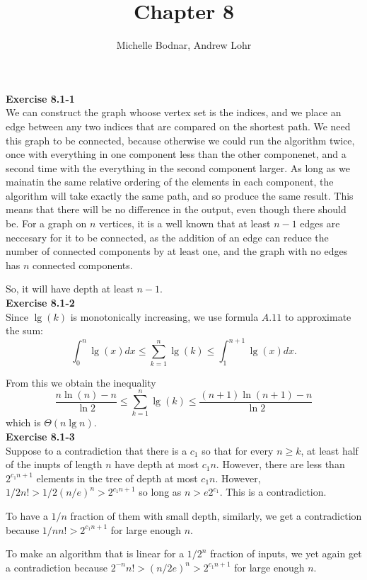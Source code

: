 \documentclass{article}
\title{Chapter 8}
\author{Michelle Bodnar, Andrew Lohr}
\begin{document}
\maketitle

\noindent\textbf{Exercise 8.1-1}\\

We can construct the graph whoose vertex set is the indices, and we place an edge between any two indices that are compared on the shortest path. We need this graph to be connected, because otherwise we could run the algorithm twice, once with everything in one component less than the other componenet, and a second time with the everything in the second component larger. As long as we mainatin the same relative ordering of the elements in each component, the algorithm will take exactly the same path, and so produce the same result. This means that there will be no difference in the output, even though there should be. For a graph on $n$ vertices, it is a well known that at least $n-1$ edges are neccesary for it to be connected, as the addition of an edge can reduce the number of connected components by at least one, and the graph with no edges has $n$ connected components.

So, it will have depth at least $n-1$.\\

\noindent\textbf{Exercise 8.1-2}\\

Since $\lg(k)$ is monotonically increasing, we use formula $A.11$ to approximate the sum:
\[ \int_0^n \lg(x)dx \leq \sum_{k=1}^n \lg(k) \leq \int_1^{n+1}\lg(x)dx.\]

From this we obtain the inequality 
\[ \frac{n\ln(n)-n}{\ln 2} \leq  \sum_{k=1}^n \lg(k) \leq \frac{(n+1)\ln(n+1) - n}{\ln 2}\]
which is $\Theta(n\lg n)$.\\


\noindent\textbf{Exercise 8.1-3}\\
Suppose to a contradiction that there is a $c_1$ so that for every $n\ge k$, at least half of the inupts of length $n$ have depth at most $c_1 n$. However, there are less than $2^{c_1 n +1}$ elements in the tree of depth at most $c_1 n$. However, $1/2 n! > 1/2(n/e)^n >2^{c_1 n +1}$ so long as $n > e2^{c_1}$. This is a contradiction.

To have a $1/n$ fraction of them with small depth, similarly, we get a contradiction because $1/n n! > 2^{c_1 n+1}$ for large enough $n$.

To make an algorithm that is linear for a $1/2^n$ fraction of inputs, we yet again get a contradiction because $2^{-n} n!  > (n/2e)^n > 2^{c_1 n+1}$ for large enough $n$.
\end{document}
